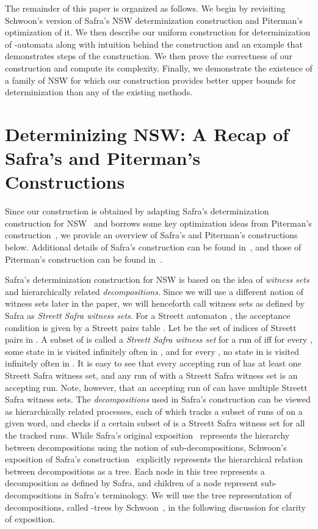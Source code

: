 \documentclass[3p]{elsarticle}
\begin{document}
The remainder of this paper is organized as follows.
We begin by revisiting Schwoon's version of Safra's NSW determinization construction and
Piterman's optimization of it. We then describe our uniform construction for
determinization of -automata along with intuition behind the
construction and an example that demonstrates steps of the construction. We then
prove the correctness of our construction and compute its complexity. Finally,
we demonstrate the existence of a family of NSW for which our construction
provides better upper bounds for determinization than any of the existing
methods.



\section{Determinizing NSW: A Recap of Safra's and Piterman's Constructions}
\label{safransw}
Since our construction is obtained by adapting Safra's determinization
construction for NSW~\cite{safra-stoc92,safra06} and borrows some key
optimization ideas from Piterman's construction~\cite{piterman}, we
provide an overview of Safra's and Piterman's constructions below.
Additional details of Safra's construction can be found
in~\cite{safra-stoc92,safra06,2001automata}, and those of Piterman's
construction can be found in~\cite{piterman}.

Safra's determinization construction for NSW is based on the idea of
\emph{witness sets} and hierarchically related \emph{decompositions}.
Since we will use a different notion of witness sets later in the
paper, we will henceforth call witness sets as defined by Safra as
\emph{Streett Safra witness sets}.  For a Streett automaton , the acceptance condition  is
given by a Streett pairs table .  Let  be the set of indices of
Streett pairs in .  A subset  of  is called a
\emph{Streett Safra witness set} for a run  of  iff for
every , some state in  is visited infinitely often in
, and for every , no state in  is visited
infinitely often in .  It is easy to see that every accepting
run of  has at least one Streett Safra witness set, and any run
of  with a Streett Safra witness set is an accepting run.  Note,
however, that an accepting run of  can have multiple Streett Safra
witness sets.  The \emph{decompositions} used in Safra's construction
can be viewed as hierarchically related processes, each of which
tracks a subset of runs of  on a given word, and checks if a
certain subset of  is a Streett Safra witness set for all the tracked runs.
While Safra's original exposition~\cite{safra-stoc92,safra06}
represents the hierarchy between decompositions using the notion of
sub-decompositions, Schwoon's exposition of Safra's
construction~\cite{2001automata} explicitly represents the
hierarchical relation between decompositions as a tree.  Each node in
this tree represents a decomposition as defined by Safra, and children
of a node represent sub-decompositions in Safra's terminology.  We
will use the tree representation of decompositions, called -trees by Schwoon~\cite{2001automata}, in the following discussion
for clarity of exposition.
\end{document}
